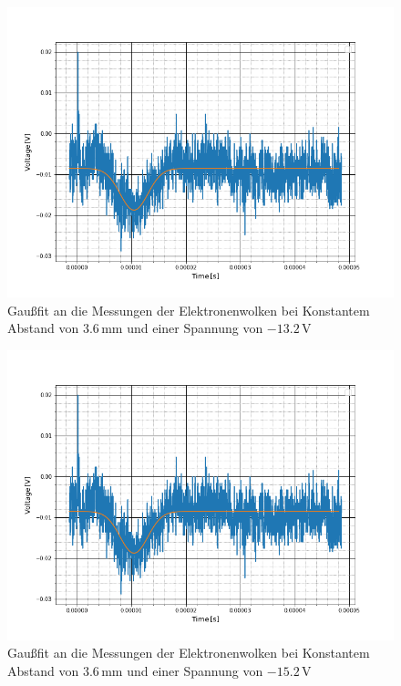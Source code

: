 \begin{figure}
	\includegraphics[scale=0.5]{Bild/A1}
	\centering
	\caption[Gaußfit an Messung bei Konst. Abstand]{Gaußfit an die Messungen der Elektronenwolken bei Konstantem Abstand von $3.6$\,mm und einer Spannung von $-13.2$\,V}
\end{figure}
\begin{figure}
	\includegraphics[scale=0.5]{Bild/A1}
	\centering
	\caption[Gaußfit an Messung bei Konst. Abstand]{Gaußfit an die Messungen der Elektronenwolken bei Konstantem Abstand von $3.6$\,mm und einer Spannung von $-15.2$\,V}
\end{figure}
